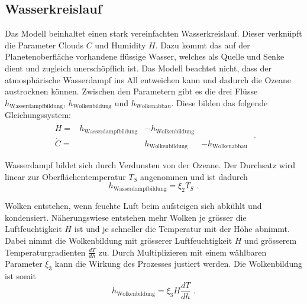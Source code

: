 \begin{refsection}
\subsection{Wasserkreislauf}
Das Modell beinhaltet einen stark vereinfachten Wasserkreislauf.
Dieser verknüpft die Parameter Clouds $C$ und Humidity $H$.
Dazu kommt das auf der Planetenoberfläche vorhandene flüssige Wasser, welches als Quelle und Senke dient und zugleich unerschöpflich ist. Das Modell beachtet nicht, dass der atmosphärische Wasserdampf ins All entweichen kann und dadurch die Ozeane austrocknen können. Zwischen den Parametern gibt es die drei Flüsse $h_{\text{Wasserdampfbildung}}$, $h_{\text{Wolkenbildung}}$ und $h_{\text{Wolkenabbau}}$. Diese bilden das folgende Gleichungssystem:
\begin{equation}
\begin{matrix}
\dot{H}   = & h_{\text{Wasserdampfbildung}} & - h_{\text{Wolkenbildung}}   &                      \\
\dot{C}   = &                     		    &   h_{\text{Wolkenbildung}}   & - h_{\text{Wolkenabbau}}
\end{matrix} \text{ .}
\end{equation}

Wasserdampf bildet sich durch Verdunsten von der Ozeane. Der Durchsatz wird linear zur Oberflächentemperatur $T_S$ angenommen und ist dadurch
\begin{equation}
h_{\text{Wasserdampfbildung}} = \xi_2 T_S \text{ .}
\end{equation}


Wolken entstehen, wenn feuchte Luft beim aufsteigen sich abkühlt und kondensiert. Näherungswiese entstehen mehr Wolken je grösser die Luftfeuchtigkeit $H$ ist und je schneller die Temperatur mit der Höhe abnimmt.
Dabei nimmt die Wolkenbildung mit grösserer Luftfeuchtigkeit $H$ und grösserem Temperaturgradienten $\frac{dT}{dh}$ zu. Durch Multiplizieren mit einem wählbaren Parameter $\xi_3$ kann die Wirkung des Prozesses justiert werden. Die Wolkenbildung ist somit
\begin{equation}
h_{\text{Wolkenbildung}} = \xi_3 H \frac{dT}{dh} \text{ .}
\end{equation}


\end{refsection}
